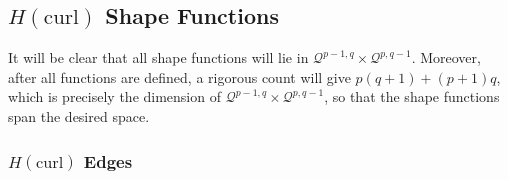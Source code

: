 \subsection{\texorpdfstring{$H(\mathrm{curl})$}{Hcurl} Shape Functions}
It will be clear that all shape functions will lie in $\mathcal{Q}^{p-1,q}\times\mathcal{Q}^{p,q-1}$. 
Moreover, after all functions are defined, a rigorous count will give $p(q+1)+(p+1)q$, which is precisely the dimension of $\mathcal{Q}^{p-1,q} \times\mathcal{Q}^{p,q-1}$, so that the shape functions span the desired space.

\subsubsection{\texorpdfstring{$H(\mathrm{curl})$}{Hcurl} Edges}
\label{sec:HcurledgesQuad}

